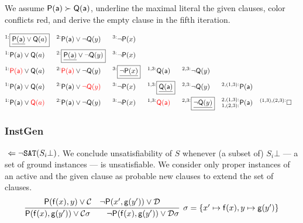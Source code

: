 \begin{example} We assume \( \mathsf{P}(\mathsf{a})\succ\mathsf{Q}(\mathsf{a}) \),
	underline the maximal literal the given clauses,
	color conflicts red,
	 and derive the empty clause in the fifth iteration.

	\begin{align*}
	^{1:}&\boxed{\underline{\mP(\ma)}\lor\mQ(a)}
	& ^{2:}&\mP(\ma)\lor\lnot\mQ(y) & ^{3:}&\lnot\mP(x)
	\\
	^{1:}&\mP(\ma)\lor\mQ(a)
	& ^{2:}&\boxed{\underline{\mP(\ma)}\lor\lnot\mQ(y)} & ^{3:}&\lnot\mP(x)
	\\
	^{1:}&{\colLo\mP(\ma)}\lor\mQ(a)
	& ^{2:}&{\colLo\mP(\ma)}\lor\lnot\mQ(y)
	& ^{3:}&\boxed{\underline{\lnot\mP(x)}}
	& ^{1,3:}&\mQ(\ma)
	& ^{2,3:}&\lnot\mQ(y)
	\\
	^{1:}&\mP(\ma)\lor\mQ(a)
	& ^{2:}&\mP(\ma)\lor{\colLo\lnot\mQ(y)}
	& ^{3:}&\lnot\mP(x)
	& ^{1,3:}&\boxed{\underline{\mQ(\ma)}}
	& ^{2,3:}&\lnot\mQ(y)
	& ^{2,(1,3):}&\mP(\ma)
	\\
	^{1:}&\mP(\ma)\lor{\colLo\mQ(a)}
	& ^{2:}&\mP(\ma)\lor\lnot\mQ(y)
	& ^{3:}&\lnot\mP(x)
	& ^{1,3:}&\colLo\mQ(\ma)
	& ^{2,3:}&\boxed{\underline{\lnot\mQ(y)}}
	& ^{2,(1,3):}_{1,(2,3):}&\mP(\ma)
	& ^{(1,3),(2,3):}&\emptyclause
	\\
	\end{align*}
\end{example}

\subsubsection{InstGen}

\jek \( \ \Leftarrow \lnot\texttt{SAT}(S_i\bot) \). We conclude unsatisfiability of \( S \) whenever (a subset of) \( S_i\bot \) --- a set of ground instances --- is unsatisfiable.
We consider only proper instances of an active and the given clause as probable new clauses to extend the set of clauses.
\begin{gather*}
	\infer[\sigma=\{ x'\mapsto\mf(x), y\mapsto\mg(y') \}]{
		\mP(\mf(x),\mg(y')) \lor\mcC\sigma
		\qquad
		\lnot\mP(\mf(x),\mg(y'))\lor\mcD\sigma
	}{
		\mP(\mf(x), y) \lor \mcC & \lnot\mP(x',\mg(y')) \lor \mcD
	}
\end{gather*}


